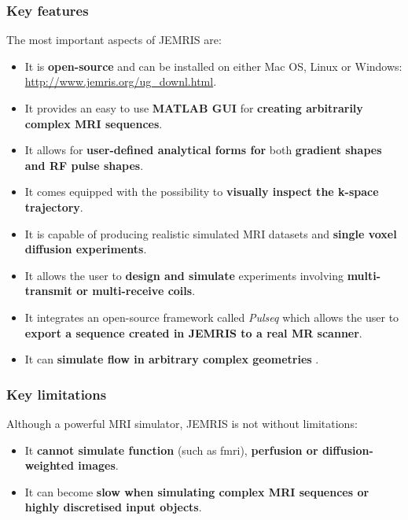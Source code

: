 \hfill

\subsubsection{Key features}
The most important aspects of JEMRIS are:
\begin{itemize}
    
    \item It is \textbf{open-source} and can be installed on either Mac OS, Linux or Windows: \url{http://www.jemris.org/ug_downl.html}.
    
    \item It provides an easy to use \textbf{MATLAB GUI} for \textbf{creating arbitrarily complex MRI sequences}.
    
    \item It allows for \textbf{user-defined analytical forms for} both \textbf{gradient shapes and RF pulse shapes}. 
    
    \item It comes equipped with the possibility to  \textbf{visually inspect the k-space trajectory}.
    
    \item It is capable of producing realistic simulated MRI datasets and  \textbf{single voxel diffusion experiments}.
    
    \item It allows the user to \textbf{design and simulate} experiments involving  \textbf{multi-transmit or multi-receive coils}.
    
    \item It integrates an open-source framework called \textit{Pulseq} \cite{Layton2017} which allows the user to  \textbf{export a sequence created in JEMRIS to a real MR scanner}.
    
    \item It can \textbf{simulate flow in arbitrary complex geometries} \cite{Fortin2016}.
    
\end{itemize}

\hfill

\subsubsection{Key limitations}
Although a powerful MRI simulator, JEMRIS is not without limitations:
\begin{itemize}
    
    \item It \textbf{cannot simulate function} (such as \ac{fmri}),  \textbf{perfusion or diffusion-weighted images}.
    
    \item It can become  \textbf{slow when simulating complex MRI sequences or highly discretised input objects}. 
    
\end{itemize}

